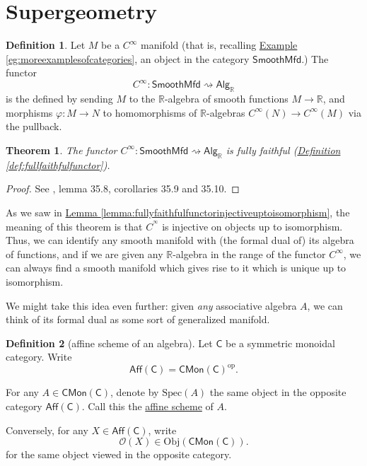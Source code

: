 \documentclass[a4paper]{report}
\newcommand{\R}{\mathbb{R}}
\newcommand{\defn}[1]{\ul{#1}}
\newcommand{\Obj}{\mathrm{Obj}}
\newcommand{\Spec}{\mathrm{Spec}}
\theoremstyle{definition}
\newtheorem{definition}{Definition}[section]
\theoremstyle{plain}
\newtheorem{theorem}{Theorem}[section]
\theoremstyle{remark}
\begin{document}
\section{Supergeometry}
\begin{definition}
  Let $M$ be a $C^{\infty}$ manifold (that is, recalling \hyperref[eg:moreexamplesofcategories]{Example \ref*{eg:moreexamplesofcategories}}, an object in the category $\mathsf{SmoothMfd}$.) The functor 
  \begin{equation*}
    C^{\infty}\colon \mathsf{SmoothMfd} \rightsquigarrow \mathsf{Alg}_{\R}
  \end{equation*}
  is the defined by sending $M$ to the $\R$-algebra of smooth functions $M \to \R$, and morphisms $\varphi\colon M \to N$ to homomorphisms of $\R$-algebras $C^{\infty}(N) \to C^{\infty}(M)$ via the pullback. 
\end{definition}

\begin{theorem}
  The functor $C^{\infty}\colon \mathsf{SmoothMfd} \rightsquigarrow \mathsf{Alg}_{\R}$ is fully faithful (\hyperref[def:fullfaithfulfunctor]{Definition \ref*{def:fullfaithfulfunctor}}).
\end{theorem}
\begin{proof}
  See \cite{KMS-natural-operations-differential-geometry}, lemma 35.8, corollaries 35.9 and 35.10.
\end{proof}

As we saw in \hyperref[lemma:fullyfaithfulfunctorinjectiveuptoisomorphism]{Lemma \ref*{lemma:fullyfaithfulfunctorinjectiveuptoisomorphism}}, the meaning of this theorem is that $C^{^\infty}$ is injective on objects up to isomorphism. Thus, we can identify any smooth manifold with (the formal dual of) its algebra of functions, and if we are given any $\R$-algebra in the range of the functor $C^{\infty}$, we can always find a smooth manifold which gives rise to it which is unique up to isomorphism.

We might take this idea even further: given \emph{any} associative algebra $A$, we can think of its formal dual as some sort of generalized manifold. 

\begin{definition}[affine scheme of an algebra]
  \label{def:affineschemeofanalgebra}
  Let $\mathsf{C}$ be a symmetric monoidal category. Write
  \begin{equation*}
    \mathsf{Aff}(\mathsf{C}) = \mathsf{CMon}(\mathsf{C})^{\text{op}}.
  \end{equation*}

  For any $A \in \mathsf{CMon}(\mathsf{C})$, denote by $\Spec(A)$ the same object in the opposite category $\mathsf{Aff}(\mathsf{C})$. Call this the \defn{affine scheme} of $A$.

  Conversely, for any $X \in \mathsf{Aff}(\mathsf{C})$, write 
  \begin{equation*}
    \mathscr{O}(X) \in \Obj(\mathsf{CMon}(\mathsf{C})).
  \end{equation*}
  for the same object viewed in the opposite category.
\end{definition}
\end{document}
